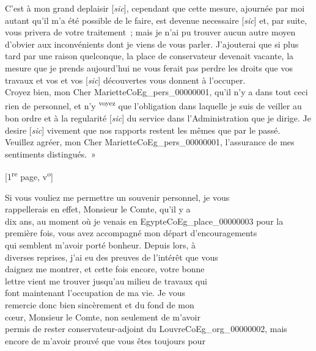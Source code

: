\documentclass{book}
\begin{document}
{{\indent C’est à mon grand deplaisir [\textit{sic}], cependant que cette mesure, ajournée par moi autant qu’il m’a été possible de le faire, est devenue necessaire [\textit{sic}] et, par suite, vous privera de votre traitement~; mais je n’ai pu trouver aucun autre moyen d’obvier aux inconvénients dont je viens de vous parler. J’ajouterai que si plus tard par une raison quelconque, la place de conservateur devenait vacante, la mesure que je prends aujourd’hui ne vous ferait pas perdre les droits que vos travaux et vos et vos [\textit{sic}] découvertes vous donnent à l’occuper.\\
\indent Croyez bien, mon Cher Mariette\gls{CoEg_pers_00000001}, qu’il n’y a dans tout ceci rien de personnel, et n’y \textsuperscript{voyez} que l’obligation dans laquelle je suis de veiller au bon ordre et à la regularité [\textit{sic}] du service dans l’Administration que je dirige. Je desire [\textit{sic}] vivement que nos rapports restent les mêmes que par le passé.\\
\indent Veuillez agréer, mon Cher Mariette\gls{CoEg_pers_00000001}, l’assurance de mes sentiments distingués.~»}
{\footnotesize \begin{center} [1\textsuperscript{re} page, v\textsuperscript{o}]\end{center}}
\indent Si vous vouliez me permettre un souvenir personnel, je vous\\
rappellerais en effet, Monsieur le Comte, qu’il y a\\
dix ans, au moment où je venais en Egypte\gls{CoEg_place_00000003} pour la\\
première fois, vous avez accompagné mon départ d’encouragements\\
qui semblent m’avoir porté bonheur. Depuis lors, à\\
diverses reprises, j’ai eu des preuves de l’intérêt que vous\\
daignez me montrer, et cette fois encore, votre bonne\\
lettre vient me trouver jusqu’au milieu de travaux qui\\
font maintenant l’occupation de ma vie. Je vous\\
remercie donc bien sincèrement et du fond de mon\\
cœur, Monsieur le Comte, non seulement de m’avoir\\
permis de rester conservateur-adjoint du Louvre\gls{CoEg_org_00000002}, mais\\
encore de m’avoir prouvé que vous êtes toujours pour\\
}
\end{document}
